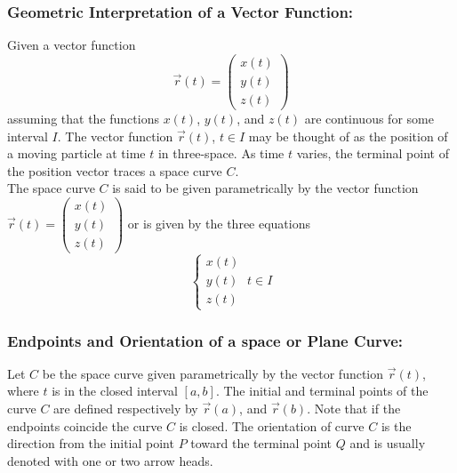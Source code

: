 \documentclass[14pt]{article}
\begin{document}
    \subsubsection{Geometric Interpretation of a Vector Function:}
    Given a vector function $$\vec{r}(t) =
    \begin{pmatrix}x(t)\\y(t)\\z(t)\end{pmatrix}$$ assuming that the
    functions $x(t)$, $y(t)$, and $z(t)$ are continuous for some
    interval $I$. The vector function $\vec{r}(t)$, $t\in I$ may be
    thought of as the position of a moving particle at time $t$ in
    three-space. As time $t$ varies, the terminal point of the position
    vector traces a space curve $C$.\\ 
    The space curve $C$ is said to be given parametrically by the vector
    function
    $\vec{r}(t)=\left(\begin{smallmatrix}x(t)\\y(t)\\z(t)\end{smallmatrix}\right)$
    or is given by the three equations
    $$ \left\{
    \begin{array}{lr}
        x(t)\\
        y(t)\\
        z(t)
    \end{array}
    \right.\ t\in I$$
    \subsubsection{Endpoints and Orientation of a space or Plane Curve:}
    Let $C$ be the space curve given parametrically by the vector
    function $\vec{r}(t)$, where $t$ is in the closed interval $[a,b]$.
    The initial and terminal points of the curve $C$ are defined
    respectively by $\vec{r}(a)$, and $\vec{r}(b)$. Note that if the
    endpoints coincide the curve $C$ is closed. The orientation of curve
    $C$ is the direction from the initial point $P$ toward the terminal
    point $Q$ and is usually denoted with one or two arrow heads.\\\\
\end{document}
